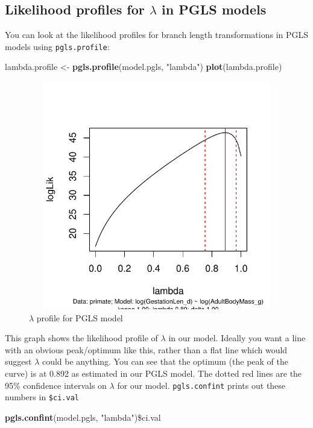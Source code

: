 \documentclass[12pt]{article}
\newcommand{\KeywordTok}[1]{\textcolor[rgb]{0.13,0.29,0.53}{\textbf{{#1}}}}
\newcommand{\StringTok}[1]{\textcolor[rgb]{0.31,0.60,0.02}{{#1}}}
\newcommand{\NormalTok}[1]{{#1}}
\begin{document}
\subsection{Likelihood profiles for $\lambda$ in PGLS models}

You can look at the likelihood profiles for branch length transformations in PGLS models using \texttt{pgls.profile}:

\begin{snugshade}
\begin{Highlighting}[]
\NormalTok{lambda.profile <-}\StringTok{ }\KeywordTok{pgls.profile}\NormalTok{(model.pgls, }\StringTok{"lambda"}\NormalTok{)}
\KeywordTok{plot}\NormalTok{(lambda.profile)}
\end{Highlighting}
\end{snugshade}

\begin{figure}[H]
\centering
\includegraphics[width = 30cm, height = 10cm, keepaspectratio=true]{lambdaplot.pdf}
\caption{$\lambda$ profile for PGLS model}
\label{figure}
\end{figure}

This graph shows the likelihood profile of $\lambda$ in our model. Ideally you want a line with an obvious peak/optimum like this, rather than a flat line which would suggest $\lambda$ could be anything. You can see that the optimum (the peak of the curve) is at 0.892 as estimated in our PGLS model. The dotted red lines are the 95\% confidence intervals on $\lambda$ for our model. \texttt{pgls.confint} prints out these numbers in \texttt{\$ci.val}

\begin{snugshade}
\begin{Highlighting}[]
\KeywordTok{pgls.confint}\NormalTok{(model.pgls, }\StringTok{"lambda"}\NormalTok{)}\NormalTok{\$ci.val}
\end{Highlighting}
\end{snugshade}
\end{document}
